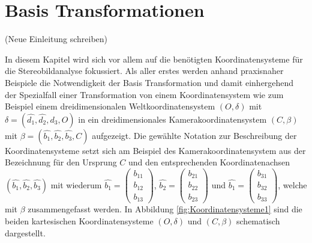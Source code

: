 \chapter{Basis Transformationen }
\label{sec:basisTransformation} 

(Neue Einleitung schreiben)
 
In diesem Kapitel wird sich vor allem auf die benötigten Koordinatensysteme für die Stereobildanalyse fokussiert. Als aller erstes werden anhand praxisnaher Beispiele die Notwendigkeit der Basis Transformation und damit einhergehend der Spezialfall einer Transformation von einem Koordinatensystem wie zum Beispiel einem dreidimensionalen Weltkoordinatensystem $(O,\delta)$ mit $\delta=(\hat{d_1}, \hat{d_2},\hat{d_3},O)$ in ein dreidimensionales Kamerakoordinatensystem $(C,\beta)$ mit $\beta=(\hat{b_1},\hat{b_2},\hat{b_3},C)$ aufgezeigt. Die gewählte Notation zur Beschreibung der Koordinatensysteme setzt sich am Beispiel des Kamerakoordinatensystem aus der Bezeichnung für den Ursprung $C$ und den entsprechenden Koordinatenachsen $(\hat{b_1},\hat{b_2},\hat{b_3})$ mit wiederum $\hat{b_1} = \begin{pmatrix}b_{11}\\b_{12}\\b_{13}\end{pmatrix}$, $\hat{b_2} = \begin{pmatrix}b_{21}\\b_{22}\\b_{23}\end{pmatrix}$ und $\hat{b_1} = \begin{pmatrix}b_{31}\\b_{32}\\b_{33}\end{pmatrix}$, welche mit $\beta$ zusammengefasst werden. In Abbildung \ref{fig:Koordinatensysteme1} sind die beiden kartesischen Koordinatensysteme $(O,\delta)$ und $(C,\beta)$ schematisch dargestellt. 

%
%
%

